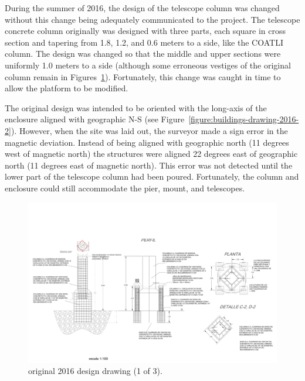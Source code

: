 During the summer of 2016, the design of the telescope column was changed without this change being adequately communicated to the project. The telescope concrete column  originally was designed with three parts, each square in cross section and tapering from 1.8, 1.2, and 0.6 meters to a side, like the COATLI column. The design was changed so that the middle and upper sections were uniformly 1.0 meters to a side (although some erroneous vestiges of the original column remain in Figures~\ref{figure:buildings-drawing-2016-1}). Fortunately, this change was caught in time to allow the platform to be modified.

The original design was intended to be oriented with the long-axis of the enclosure aligned with geographic N-S (see Figure~\ref{figure:buildings-drawing-2016-2}). However, when the site was laid out, the surveyor made a sign error in the magnetic deviation. Instead of being aligned with geographic north (11 degrees west of magnetic north) the structures were aligned 22 degrees east of geographic north (11 degrees east of magnetic north). This error was not detected until the lower part of the telescope column had been poured. Fortunately, the column and enclosure could still accommodate the pier, mount, and telescopes.

\begin{figure}
\begin{center}
\includegraphics[height=0.95\linewidth,angle=90]{figures/buildings-ddoti-drawing-2016-1.pdf}
\end{center}
\caption{{\projectname} original 2016 design drawing (1 of 3).}
\label{figure:buildings-drawing-2016-1}
\end{figure}

